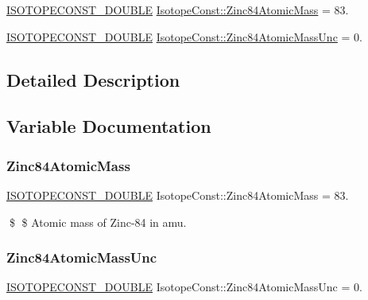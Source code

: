 \begin{DoxyCompactItemize}
\item 
\mbox{\hyperlink{group___isotope_const-_macros_ga8f45a7272ce02c0b4c65c44636ed719a}{I\+S\+O\+T\+O\+P\+E\+C\+O\+N\+S\+T\+\_\+\+D\+O\+U\+B\+LE}} \mbox{\hyperlink{group___isotope_const-_zinc-_zn84_ga75d0780f6d1cae738286373ad80b5a4c}{Isotope\+Const\+::\+Zinc84\+Atomic\+Mass}} = 83.
\item 
\mbox{\hyperlink{group___isotope_const-_macros_ga8f45a7272ce02c0b4c65c44636ed719a}{I\+S\+O\+T\+O\+P\+E\+C\+O\+N\+S\+T\+\_\+\+D\+O\+U\+B\+LE}} \mbox{\hyperlink{group___isotope_const-_zinc-_zn84_gaa62e2ef79b481e1d6d39f20148b9f930}{Isotope\+Const\+::\+Zinc84\+Atomic\+Mass\+Unc}} = 0.
\end{DoxyCompactItemize}


\subsection{Detailed Description}


\subsection{Variable Documentation}
\mbox{\label{group___isotope_const-_zinc-_zn84_ga75d0780f6d1cae738286373ad80b5a4c}} 
\subsubsection{\texorpdfstring{Zinc84\+Atomic\+Mass}{Zinc84AtomicMass}}
{\footnotesize\ttfamily \mbox{\hyperlink{group___isotope_const-_macros_ga8f45a7272ce02c0b4c65c44636ed719a}{I\+S\+O\+T\+O\+P\+E\+C\+O\+N\+S\+T\+\_\+\+D\+O\+U\+B\+LE}} Isotope\+Const\+::\+Zinc84\+Atomic\+Mass = 83.}

\$ \$ Atomic mass of Zinc-\/84 in amu. \mbox{\label{group___isotope_const-_zinc-_zn84_gaa62e2ef79b481e1d6d39f20148b9f930}} 
\subsubsection{\texorpdfstring{Zinc84\+Atomic\+Mass\+Unc}{Zinc84AtomicMassUnc}}
{\footnotesize\ttfamily \mbox{\hyperlink{group___isotope_const-_macros_ga8f45a7272ce02c0b4c65c44636ed719a}{I\+S\+O\+T\+O\+P\+E\+C\+O\+N\+S\+T\+\_\+\+D\+O\+U\+B\+LE}} Isotope\+Const\+::\+Zinc84\+Atomic\+Mass\+Unc = 0.}

